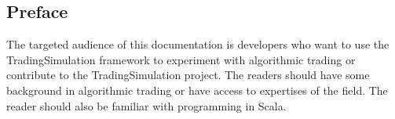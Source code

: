 
\subsection*{Preface}

The targeted audience of this documentation is developers who want to use the TradingSimulation framework to experiment with algorithmic trading or contribute to the TradingSimulation project. The readers should have some background in algorithmic trading or have access to expertises of the field. The reader should also be familiar with programming in Scala.
